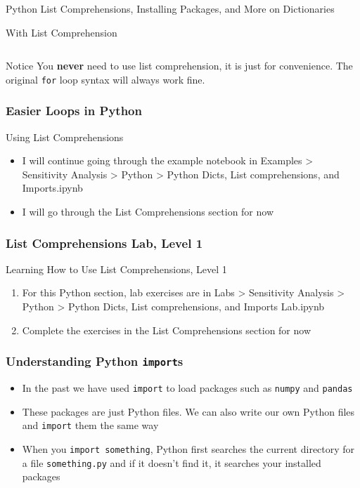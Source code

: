 \documentclass[handout, 11pt]{beamer}
\begin{document}
\begin{section}{Python List Comprehensions, Installing Packages, and More on Dictionaries}
\begin{frame}[fragile]
\begin{block}{With List Comprehension}
\begin{verbatim}
\end{verbatim}
\end{block}
\begin{block}{Notice}
You
\textbf{never}
need to use list comprehension, it is just for convenience. The original
\texttt{for}
loop syntax will always work fine.
\end{block}
\end{frame}
\begin{frame}
\frametitle{Easier Loops in Python}
{
\begin{block}{Using List Comprehensions}
\begin{itemize}
\item I will continue going through the example notebook in Examples > Sensitivity Analysis > Python > Python Dicts, List comprehensions, and Imports.ipynb
\item I will go through the List Comprehensions section for now
\end{itemize}
\end{block}
}
\end{frame}
\begin{frame}
\frametitle{List Comprehensions Lab, Level 1}
{
\begin{block}{Learning How to Use List Comprehensions, Level 1}
\begin{enumerate}
\item For this Python section, lab exercises are in Labs > Sensitivity Analysis > Python > Python Dicts, List comprehensions, and Imports Lab.ipynb
\item Complete the exercises in the List Comprehensions section for now
\end{enumerate}
\vfill
\end{block}
}
\label{labs:python:list-comps-1}
\end{frame}
\begin{frame}
\frametitle{Understanding Python \texttt{import}s}
\begin{itemize}
\item In the past we have used
\texttt{import}
to load packages such as
\texttt{numpy}
and
\texttt{pandas}
\vfill
\item These packages are just Python files. We can also write our own Python files and
\texttt{import}
them the same way
\vfill
\item When you \texttt{import something}, Python first searches the current directory for a file
\texttt{something.py}
and if it doesn't find it, it searches your installed packages

\end{itemize}
\end{frame}
\end{section}
\end{document}
